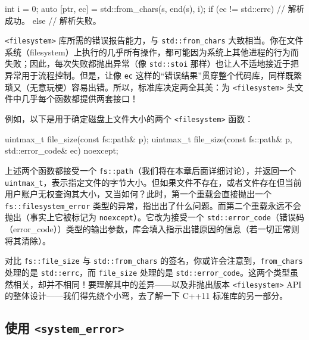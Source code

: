 \begin{codebox}[cpp]
    int i = 0;
    auto [ptr, ec] = std::from_chars(s, end(s), i);
    if (ec != std::errc{}) {
      // 解析成功。
    } else {
      // 解析失败。
    }
\end{codebox}

\texttt{<filesystem>\allowbreak{}} 库所需的错误报告能力，与 \texttt{std::\allowbreak{}from\_\allowbreak{}chars} 大致相当。你在文件系统（filesystem）上执行的几乎所有操作，都可能因为系统上其他进程的行为而失败；因此，每次失败都抛出异常（像 \texttt{std::\allowbreak{}stoi} 那样）也让人不适地接近于把异常用于流程控制。但是，让像 \texttt{ec} 这样的“错误结果”贯穿整个代码库，同样既繁琐又（无意玩梗）容易出错。所以，标准库决定两全其美：为 \texttt{<filesystem>\allowbreak{}} 头文件中几乎每个函数都提供两套接口！

例如，以下是用于确定磁盘上文件大小的两个 \texttt{<filesystem>\allowbreak{}} 函数：

\begin{codebox}[cpp]
    uintmax_t file_size(const fs::path& p);
    uintmax_t file_size(const fs::path& p,
       std::error_code& ec) noexcept;
\end{codebox}

上述两个函数都接受一个 \texttt{fs::\allowbreak{}path}（我们将在本章后面详细讨论），并返回一个 \texttt{uintmax\_\allowbreak{}t}，表示指定文件的字节大小。但如果文件不存在，或者文件存在但当前用户账户无权查询其大小，又当如何？此时，第一个重载会直接抛出一个 \texttt{fs::\allowbreak{}filesystem\_\allowbreak{}error} 类型的异常，指出出了什么问题。而第二个重载永远不会抛出（事实上它被标记为 \texttt{noexcept}）。它改为接受一个 \texttt{std::\allowbreak{}error\_\allowbreak{}code}（错误码（error\_\allowbreak{}code））类型的输出参数，库会填入指示出错原因的信息（若一切正常则将其清除）。

对比 \texttt{fs::\allowbreak{}file\_\allowbreak{}size} 与 \texttt{std::\allowbreak{}from\_\allowbreak{}chars} 的签名，你或许会注意到，\texttt{from\_\allowbreak{}chars} 处理的是 \texttt{std::\allowbreak{}errc}，而 \texttt{file\_\allowbreak{}size} 处理的是 \texttt{std::\allowbreak{}error\_\allowbreak{}code}。这两个类型虽然相关，却并不相同！要理解其中的差异——以及非抛出版本 \texttt{<filesystem>\allowbreak{}} API 的整体设计——我们得先绕个小弯，去了解一下 C++11 标准库的另一部分。

\subsection{使用 \texttt{<system\_\allowbreak{}error>\allowbreak{}}}

